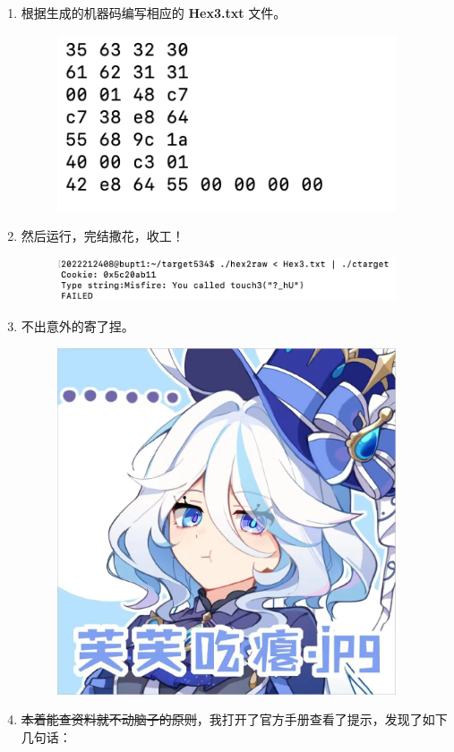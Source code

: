 \begin{enumerate}
            \item 根据生成的机器码编写相应的 \textbf{Hex3.txt} 文件。
                \begin{figure}[htbp]
                    \includegraphics*[width = 10cm]{s3_3.png}
                \end{figure}
            \item 然后运行，完结撒花，收工！
                \begin{figure}[htbp]
                    \includegraphics*[width = 10cm]{s3_4.png}
                \end{figure}
            \item 不出意外的寄了捏。
                \begin{figure}[htbp]
                    \includegraphics*[width = 10cm]{furina.jpg}
                \end{figure}
            \item \sout{本着能查资料就不动脑子的原则}，我打开了官方手册查看了提示，发现了如下几句话：

\end{enumerate}
